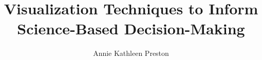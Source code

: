 \documentclass[12pt,draftcls]{ucdavisthesisakp}
\title          {Visualization Techniques to Inform Science-Based Decision-Making
}
\author         {Annie Kathleen Preston}
\begin{document}
\newcommand{\bibfont}{\singlespacing}



\makeintropages %










\end{document}
